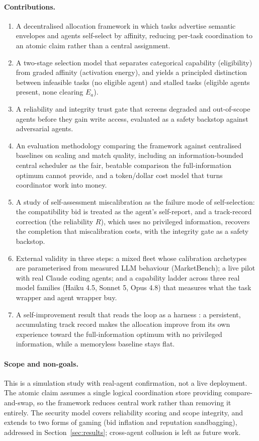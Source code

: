 \documentclass[11pt]{article}
\begin{document}
\paragraph{Contributions.}
\begin{enumerate}\itemsep2pt
\item A decentralised allocation framework in which tasks advertise semantic envelopes and agents self-select by affinity, reducing per-task coordination to an atomic claim rather than a central assignment.
\item A two-stage selection model that separates categorical capability (eligibility) from graded affinity (activation energy), and yields a principled distinction between infeasible tasks (no eligible agent) and stalled tasks (eligible agents present, none clearing $E_a$).
\item A reliability and integrity trust gate that screens degraded and out-of-scope agents before they gain write access, evaluated as a safety backstop against adversarial agents.
\item An evaluation methodology comparing the framework against centralised baselines on scaling and match quality, including an information-bounded central scheduler as the fair, beatable comparison the full-information optimum cannot provide, and a token/dollar cost model that turns coordinator work into money.
\item A study of self-assessment miscalibration as the failure mode of self-selection: the compatibility bid is treated as the agent's self-report, and a track-record correction (the reliability $R$), which uses no privileged information, recovers the completion that miscalibration costs, with the integrity gate as a safety backstop.
\item External validity in three steps: a mixed fleet whose calibration archetypes are parameterised from measured LLM behaviour (MarketBench); a live pilot with real Claude coding agents; and a capability ladder across three real model families (Haiku 4.5, Sonnet 5, Opus 4.8) that measures what the task wrapper and agent wrapper buy.
\item A self-improvement result that reads the loop as a harness \citep{weng2026harness}: a persistent, accumulating track record makes the allocation improve from its own experience toward the full-information optimum with no privileged information, while a memoryless baseline stays flat.
\end{enumerate}

\paragraph{Scope and non-goals.} This is a simulation study with real-agent confirmation, not a live deployment. The atomic claim assumes a single logical coordination store providing compare-and-swap, so the framework reduces central work rather than removing it entirely. The security model covers reliability scoring and scope integrity, and extends to two forms of gaming (bid inflation and reputation sandbagging), addressed in Section~\ref{sec:results}; cross-agent collusion is left as future work.
\end{document}
